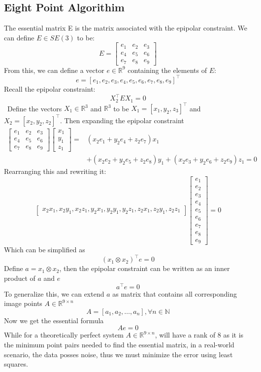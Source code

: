\documentclass{article}
\begin{document}
\subsection{Eight Point Algorithim}
The essential matrix E is the matrix associated with the epipolar constraint. We can define $E\in SE(3)$ to be:
$$E = 
\begin{bmatrix}
    e_1& e_2& e_3\\
    e_4& e_5& e_6\\
    e_7& e_8& e_9
\end{bmatrix}
$$
From this, we can define a vector $e \in \mathbb{R}^9$ containing the elements of $E$:
$$e = [e_1, e_2, e_3, e_4, e_5, e_6, e_7, e_8, e_9]^\top$$
Recall the epipolar constraint:
$$X^\top_2 E X_1 = 0 $$\
Define the vectors $X_1 \in \mathbb{R}^3$ and $\mathbb{R}^3$ to be $X_1 = [x_1, y_2, z_3]^\top$ and $X_2 = [x_2, y_2, z_2]^\top$.
Then expanding the epipolar constraint
\begin{align*}
    [x_2, y_2, z_2]\begin{bmatrix}
    e_1& e_2& e_3\\
    e_4& e_5& e_6\\
    e_7& e_8& e_9
\end{bmatrix}
\begin{bmatrix}
    x_1\\ y_1\\ z_1
\end{bmatrix} = & \left(x_2e_1+y_2e_4+z_2e_7\right)x_1
\\&+\left(x_2e_2+y_2e_5+z_2e_8\right)y_1+\left(x_2e_3+y_2e_6+z_2e_9\right)z_1 = 0
\end{align*}
Rearranging this and rewriting it:
$$\begin{bmatrix}
    x_2x_1, x_2y_1, x_2z_1, y_2x_1, y_2y_1, y_2z_1, z_2x_1, z_2y_1, z_2z_1
\end{bmatrix}\begin{bmatrix}
    e_1\\ e_2\\ e_3\\ e_4\\e_5\\ e_6\\ e_7\\ e_8\\ e_9
\end{bmatrix} = 0$$
Which can be simplified as 
$$(x_1\otimes x_2)^\top e = 0$$
Define $a=x_1\otimes x_2$, then the epipolar constraint can be written as an inner product of $a$ and $e$
$$a^\top e = 0$$
To generalize this, we can extend $a$ as matrix that contains all corresponding image points $A\in \mathbb{R}^{9\times n }$
$$A = [a_1, a_2, \ldots, a_n], \forall n \in \mathbb{N}$$
Now we get the essential formula $$Ae=0$$
While for a theoretically perfect system $A\in \mathbb{R}^{9\times n }$, will have a rank of 8 as it is the minimum point pairs needed to find the essential matrix, in a real-world scenario, the data posses noise, thus we must minimize the error using least squares.
\end{document}
